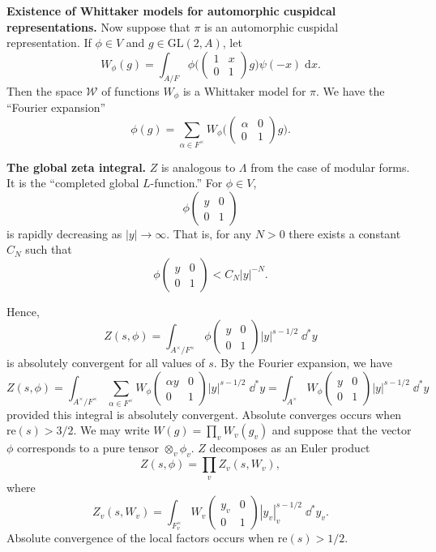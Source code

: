 \documentclass[12pt, letterpaper, twoside]
{article}
\newcommand{\ra}{\rightarrow}
\newcommand{\dd}[1]{\mathrm{d}#1} %
\newcommand{\GL}{{\text{GL}}} %
\begin{document}
\textbf{Existence of Whittaker models for automorphic cuspidcal
representations.} Now suppose that $\pi$ is an automorphic cuspidal
representation. If $\phi \in V$ and $g \in \GL(2, A)$, let
\[W_\phi(g) = \int_{A/F} \phi \bigg( \begin{pmatrix} 1 & x \\ 0 & 1
\end{pmatrix} g\bigg) \psi(-x) \; \dd x.\] Then the space $\mathcal{W}$ of
functions $W_\phi$ is a Whittaker model for $\pi$. We have the ``Fourier
expansion''
\[\phi(g) = \sum_{\alpha \in F^\times} W_\phi\bigg( \begin{pmatrix} \alpha & 0
\\ 0 & 1 \end{pmatrix} g\bigg).\]

\textbf{The global zeta integral.} $Z$ is analogous to $\Lambda$ from the case
of modular forms. It is the ``completed global $L$-function.'' For $\phi \in V$,
\[\phi \begin{pmatrix} y & 0 \\ 0 & 1 \end{pmatrix}\] is rapidly decreasing as
$|y| \ra \infty$. That is, for any $N > 0$ there exists a constant $C_N$ such
that
\[\phi \begin{pmatrix} y & 0 \\ 0 & 1 \end{pmatrix} < C_N|y|^{-N}.\]

Hence,
\[Z(s, \phi) = \int_{A^\times/F^\times} \phi \begin{pmatrix} y & 0 \\ 0 & 1
\end{pmatrix} |y|^{s - 1/2} \; \dd^* y\] is absolutely convergent for all values
of $s$. By the Fourier expansion, we have
\[Z(s, \phi) = \int_{A^\times / F^\times} \sum_{\alpha \in F^\times }
W_\phi\begin{pmatrix}\alpha y & 0 \\ 0 & 1 \end{pmatrix} |y|^{s - 1/2} \; \dd^*
y = \int_{A^\times} W_\phi \begin{pmatrix} y & 0 \\ 0 & 1 \end{pmatrix} |y|^{s -
1/2} \; \dd^* y\] provided this integral is absolutely convergent. Absolute
converges occurs when $\text{re}(s) > 3/2$. We may write $W(g) = \prod_v
W_v(g_v)$ and suppose that the vector $\phi$ corresponds to a pure tensor
$\otimes_v \phi_v$. $Z$ decomposes as an Euler product
\[Z(s, \phi) = \prod_v Z_v(s, W_v),\] where
\[Z_v(s, W_v) = \int_{F_v^\times} W_v \begin{pmatrix} y_v & 0 \\ 0 & 1
\end{pmatrix} |y_v|_v^{s - 1/2} \; \dd^* y_v.\] Absolute convergence of the
local factors occurs when $\text{re}(s) > 1/2$.
\end{document}
